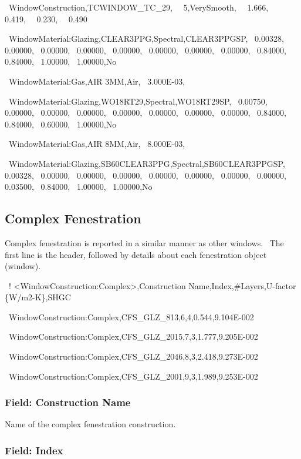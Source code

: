 ~WindowConstruction,TCWINDOW\_TC\_29,~~ 5,VerySmooth,~~ 1.666,~~ 0.419,~~ 0.230,~~ 0.490

~WindowMaterial:Glazing,CLEAR3PPG,Spectral,CLEAR3PPGSP,~ 0.00328,~ 0.00000,~ 0.00000,~ 0.00000,~ 0.00000,~ 0.00000,~ 0.00000,~ 0.00000,~ 0.84000,~ 0.84000,~ 1.00000,~ 1.00000,No

~WindowMaterial:Gas,AIR 3MM,Air,~ 3.000E-03,

~WindowMaterial:Glazing,WO18RT29,Spectral,WO18RT29SP,~ 0.00750,~ 0.00000,~ 0.00000,~ 0.00000,~ 0.00000,~ 0.00000,~ 0.00000,~ 0.00000,~ 0.84000,~ 0.84000,~ 0.60000,~ 1.00000,No

~WindowMaterial:Gas,AIR 8MM,Air,~ 8.000E-03,

~WindowMaterial:Glazing,SB60CLEAR3PPG,Spectral,SB60CLEAR3PPGSP,~ 0.00328,~ 0.00000,~ 0.00000,~ 0.00000,~ 0.00000,~ 0.00000,~ 0.00000,~ 0.00000,~ 0.03500,~ 0.84000,~ 1.00000,~ 1.00000,No

\subsection{Complex Fenestration}\label{complex-fenestration}

Complex fenestration is reported in a similar manner as other windows.~ The first line is the header, followed by details about each fenestration object (window).

~! \textless{}WindowConstruction:Complex\textgreater{},Construction Name,Index,\#Layers,U-factor \{W/m2-K\},SHGC

~WindowConstruction:Complex,CFS\_GLZ\_813,6,4,0.544,9.104E-002

~WindowConstruction:Complex,CFS\_GLZ\_2015,7,3,1.777,9.205E-002

~WindowConstruction:Complex,CFS\_GLZ\_2046,8,3,2.418,9.273E-002

~WindowConstruction:Complex,CFS\_GLZ\_2001,9,3,1.989,9.253E-002

\subsubsection{Field: Construction Name}\label{field-construction-name-2}

Name of the complex fenestration construction.

\subsubsection{Field: Index}\label{field-index}

